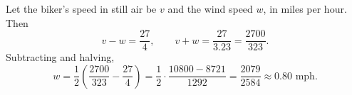 Let the biker's speed in still air be $v$ and the wind speed $w$, in miles per hour. Then
\[
v-w=\dfrac{27}{4},\qquad v+w=\dfrac{27}{3.23}=\dfrac{2700}{323}.
\]
Subtracting and halving,
\[
w=\dfrac{1}{2}\left(\dfrac{2700}{323}-\dfrac{27}{4}\right)=\dfrac{1}{2}\cdot\dfrac{10800-8721}{1292}=\boxed{\dfrac{2079}{2584}}\approx\boxed{0.80}\text{ mph}.
\]
